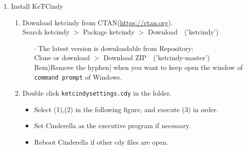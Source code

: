 \documentclass{article}
\begin{document}
\begin{enumerate}[\bf\large 1.]
\item Install KeTCindy
  \begin{enumerate}[(1)]
  \item Download ketcindy from CTAN(\url{https://ctan.org}).\\
  \hspace*{10mm}Search ketcindy $>$ Pack­age ketcindy $>$ Download\ \ ('ketcindy')
    \begin{itemize}
    \item[$\cdot$]The {\color{red}latest  version} is downloadable from Repository:\\
         \hspace*{10mm}Clone or download $>$ Download ZIP\ \ ('ketcindy-master')\\
        \hspace*{5mm}Rem)Remove the hyphen| when you want to keep open the window of \verb|command prompt| of Windows.
    \end{itemize}
  \item Double click \verb|ketcindysettings.cdy| in the folder.
    \begin{itemize}
   \item  Select (1),(2) in the following figure, and execute (3) in order.
    \item Set Cinderella as the executive program if necessary.
    \item Reboot Cinderella if other cdy files are open.
   \end{itemize}
  \end{enumerate}



\end{enumerate}
\end{document}
